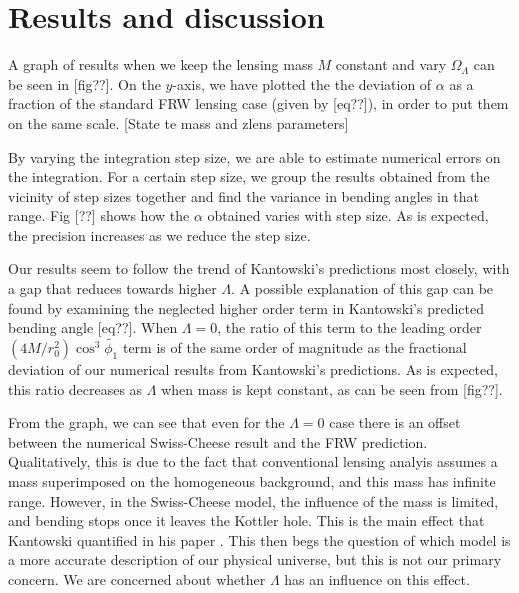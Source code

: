 \chapter{Results and discussion}
\label{chapter:results}

A graph of results when we keep the lensing mass $M$ constant and vary $\Omega_{\Lambda}$ can be seen in [fig??]. On the $y$-axis, we have plotted the the deviation of $\alpha$ as a fraction of the standard FRW lensing case (given by [eq??]), in order to put them on the same scale. [State te mass and zlens parameters] 

By varying the integration step size, we are able to estimate numerical errors on the integration. For a certain step size, we group the results obtained from the vicinity of step sizes together and find the variance in bending angles in that range. Fig [??] shows how the $\alpha$ obtained varies with step size. As is expected, the precision increases as we reduce the step size. 

Our results seem to follow the trend of Kantowski's predictions most closely, with a gap that reduces towards higher $\Lambda$. A possible explanation of this gap can be found by examining the neglected higher order term in Kantowski's predicted bending angle [eq??]. When $\Lambda = 0$, the ratio of this term to the leading order $(4M/r_0^2) \cos^3 \tilde{\phi_1}$ term is of the same order of magnitude as the fractional deviation of our numerical results from Kantowski's predictions. As is expected, this ratio decreases as $\Lambda$ when mass is kept constant, as can be seen from [fig??]. 

From the graph, we can see that even for the $\Lambda = 0$ case there is an offset between the numerical Swiss-Cheese result and the FRW prediction. Qualitatively, this is due to the fact that conventional lensing analyis assumes a mass superimposed on the homogeneous background, and this mass has infinite range. However, in the Swiss-Cheese model, the influence of the mass is limited, and bending stops once it leaves the Kottler hole. This is the main effect that Kantowski quantified in his paper \citet{kantowski2010gravitational}. This then begs the question of which model is a more accurate description of our physical universe, but this is not our primary concern. We are concerned about whether $\Lambda$ has an influence on this effect. 

